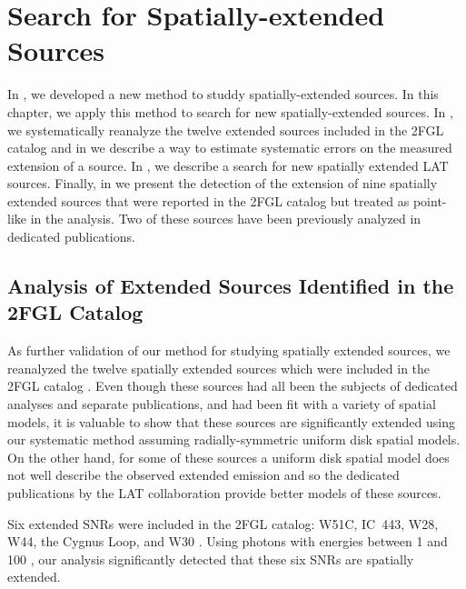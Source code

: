 
\chapter{Search for Spatially-extended  Sources}


In , we developed a new method to studdy
spatially-extended sources.  In this chapter, we apply this method to
search for new spatially-extended sources.  In ,
we systematically reanalyze the twelve extended sources included in the
2FGL catalog and in  we describe a
way to estimate systematic errors on the measured extension of a source.
In , we describe a search for new
spatially extended LAT sources. Finally, in 
we present the detection of the extension of nine spatially extended
sources that were reported in the 2FGL catalog but treated as point-like
in the analysis.  Two of these sources have been previously analyzed in
dedicated publications.


\section{Analysis of Extended Sources Identified in the 2FGL Catalog}

As further validation of our method for studying
spatially extended sources, we reanalyzed the twelve spatially extended
sources which were included in the 2FGL catalog \citep{nolan_2012_fermi-large}.  
Even though these sources had all been the subjects of dedicated
analyses and separate publications, and had been fit with a variety
of spatial models,
it is valuable to show that
these sources are significantly extended using our systematic 
method assuming radially-symmetric uniform disk spatial models.  On the other hand, for some of
these sources a uniform disk spatial model does not well describe the
observed extended emission and so the dedicated 
publications by the LAT collaboration provide better models of these sources.

Six extended SNRs were
included in the 2FGL catalog: W51C, IC~443, W28, W44, the Cygnus Loop,
and W30
\citep{abdo_2009a_fermi-discovery,abdo_2010a_observation-supernova,abdo_2010d_fermi-large,abdo_2010a_gamma-ray-emission,katagiri_2011a_fermi-large,ajello_2012a_fermi-large}.
Using photons
with energies between
1 \gev and 100 \gev, our analysis significantly detected
that these six SNRs are spatially extended.

